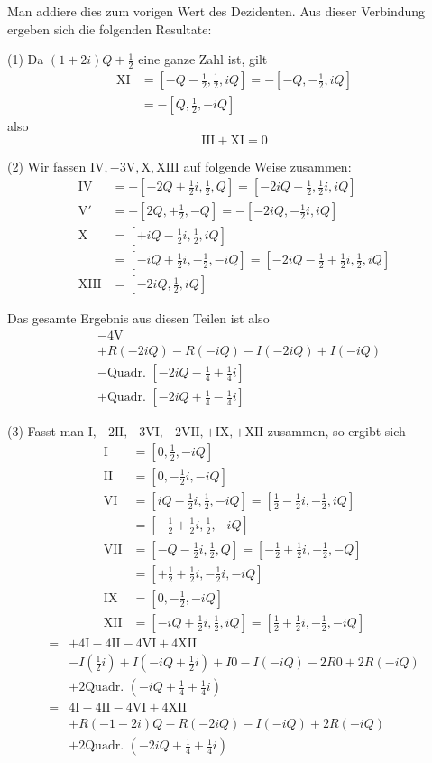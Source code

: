 Man addiere dies zum vorigen Wert des Dezidenten. Aus dieser Verbindung ergeben sich die folgenden Resultate:

(1) Da $(1+2i)Q+\frac12$ eine ganze Zahl ist, gilt
\[
\begin{aligned}
\mathrm{XI}&=[-Q-\tfrac12,\tfrac12,iQ]= -[-Q,-\tfrac12,iQ]\\
&=-[Q,\tfrac12,-iQ]
\end{aligned}
\]
also
\[
\mathrm{III}+\mathrm{XI}=0
\]

(2) Wir fassen $\mathrm{IV},-3\mathrm{V},\mathrm{X},\mathrm{XIII}$ auf folgende Weise zusammen:
\[
\begin{aligned}
\mathrm{IV}&=+[-2Q+\tfrac12i,\tfrac12,Q]=[-2iQ-\tfrac12,\tfrac12i,iQ]\\
\mathrm{V}'&=-[2Q,+\tfrac12,-Q]=-[-2iQ,-\tfrac12i,iQ]\\
\mathrm{X}&=[+iQ-\tfrac12i,\tfrac12,iQ]\\
&=[-iQ+\tfrac12i,-\tfrac12,-iQ]=[-2iQ-\tfrac12+\tfrac12i,\tfrac12,iQ]\\
\mathrm{XIII}&=[-2iQ,\tfrac12,iQ]
\end{aligned}
\]


Das gesamte Ergebnis aus diesen Teilen ist also
\[
\begin{aligned}
&-4\mathrm{V}\\
&+R(-2iQ)-R(-iQ)-I(-2iQ)+I(-iQ)\\
&-\text{Quadr. }[-2iQ-\tfrac14+\tfrac14i]\\
&+\text{Quadr. }[-2iQ+\tfrac14-\tfrac14i]
\end{aligned}
\]

(3) Fasst man $\mathrm{I},-2\mathrm{II},-3\mathrm{VI},+2\mathrm{VII},+\mathrm{IX},+\mathrm{XII}$ zusammen, so ergibt sich
\[
\begin{aligned}
\mathrm{I}&=[0,\tfrac12,-iQ]\\
\mathrm{II}&=[0,-\tfrac12i,-iQ]\\
\mathrm{VI}&=[iQ-\tfrac12i,\tfrac12,-iQ]=[\tfrac12-\tfrac12i,-\tfrac12,iQ]\\
&=[-\tfrac12+\tfrac12i,\tfrac12,-iQ]\\
\mathrm{VII}&=[-Q-\tfrac12i,\tfrac12,Q]=[-\tfrac12+\tfrac12i,-\tfrac12,-Q]\\
&=[+\tfrac12+\tfrac12i,-\tfrac12i,-iQ]\\
\mathrm{IX}&=[0,-\tfrac12,-iQ]\\
\mathrm{XII}&=[-iQ+\tfrac12i,\tfrac12,iQ]=[\tfrac12+\tfrac12i,-\tfrac12,-iQ]
\end{aligned}
\]
\[
\begin{aligned}
={}&+4\mathrm{I}-4\mathrm{II}-4\mathrm{VI}+4\mathrm{XII}\\
&-I(\tfrac12i)+I(-iQ+\tfrac12i)+I0-I(-iQ)-2R0+2R(-iQ)\\
&+2\text{Quadr. }(-iQ+\tfrac14+\tfrac14i)\\
={}&4\mathrm{I}-4\mathrm{II}-4\mathrm{VI}+4\mathrm{XII}\\
&+R(-1-2i)Q-R(-2iQ)-I(-iQ)+2R(-iQ)\\
&+2\text{Quadr. }(-2iQ+\tfrac14+\tfrac14i)
\end{aligned}
\]

